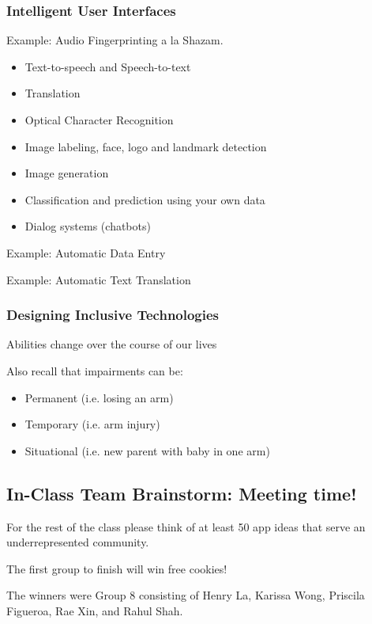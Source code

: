 \subsubsection{Intelligent User Interfaces}
Example: Audio Fingerprinting a la Shazam.
\begin{itemize}
    \item Text-to-speech and Speech-to-text
    \item Translation
    \item Optical Character Recognition
    \item Image labeling, face, logo and landmark detection
    \item Image generation
    \item Classification and prediction using your own data
    \item Dialog systems (chatbots)
\end{itemize}
Example: Automatic Data Entry

Example: Automatic Text Translation

\subsubsection{Designing Inclusive Technologies}
\begin{shaded}
Abilities change over the course of our lives
\end{shaded}
Also recall that impairments can be:
\begin{itemize}
    \item Permanent (i.e. losing an arm)
    \item Temporary (i.e. arm injury)
    \item Situational (i.e. new parent with baby in one arm)
\end{itemize}

\subsection{In-Class Team Brainstorm: Meeting time!}
For the rest of the class please think of at least 50 app ideas that serve an underrepresented community.

The first group to finish will win free cookies!
\begin{shaded}
The winners were Group 8 consisting of Henry La, Karissa Wong, Priscila Figueroa, Rae Xin, and Rahul Shah.
\end{shaded}
